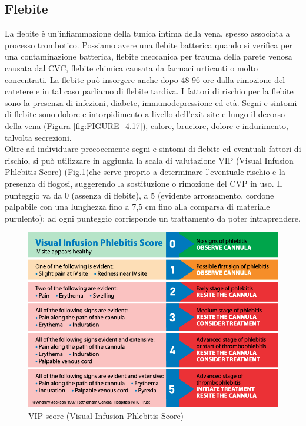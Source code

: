 \subsection{Flebite}

La flebite è un’infiammazione della tunica intima della vena, spesso associata a processo trombotico. 
Possiamo avere una flebite batterica quando si verifica per una contaminazione batterica, flebite meccanica per 
trauma della parete venosa causata dal CVC, flebite chimica causata da farmaci urticanti o molto concentrati. 
La flebite può insorgere anche dopo 48-96 ore dalla rimozione del catetere e in tal caso parliamo di flebite tardiva. 
I fattori di rischio per la flebite sono la presenza di infezioni, diabete, immunodepressione ed età. 
Segni e sintomi di flebite sono dolore e intorpidimento a livello dell’exit-site e lungo il decorso della vena 
(Figura \ref{fig:FIGURE_4.17}), 
calore, bruciore, dolore e indurimento, talvolta secrezioni\cite{AIOMCVC}.\\
Oltre ad individuare precocemente segni e sintomi di flebite ed eventuali fattori di rischio, si può utilizzare 
in aggiunta la scala di valutazione VIP (Visual Infusion Phlebitis Score) (Fig.\ref{fig:FIGURE_4.16})che 
serve proprio a determinare l'eventuale rischio e la presenza di flogosi, 
suggerendo la sostituzione o rimozione del CVP in uso. Il punteggio va da 0 
(assenza di flebite), a 5 (evidente arrossamento, cordone palpabile con una lunghezza fino a 7,5 cm 
fino alla comparsa di materiale purulento); ad ogni punteggio corrisponde un trattamento da poter intraprendere\cite{FNOPIRIVISTA}.

\begin{figure}[H]
    \begin{center}
    \includegraphics[width=0.6\columnwidth]{img/VIPSCORE.png}
    \end{center}
    \caption{VIP score (Visual Infusion Phlebitis Score)
    \cite{img52}}
    \label{fig:FIGURE_4.16}
\end{figure}

